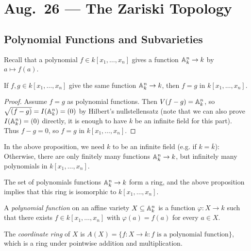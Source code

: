 \chapter{Aug.~26 --- The Zariski Topology}

\section{Polynomial Functions and Subvarieties}

\begin{remark}
  Recall that a polynomial
  $f \in k[x_1, \dots, x_n]$
  gives a function
  $\mathbb{A}_k^n \to k$ by
  $a \mapsto f(a)$.
\end{remark}

\begin{prop}
  If $f, g \in k[x_1, \dots, x_n]$
  give the same function
  $\mathbb{A}_k^n \to k$, then
  $f = g$ in $k[x_1, \dots, x_n]$.
\end{prop}

\begin{proof}
  Assume $f = g$ as polynomial functions.
  Then $V(f - g) = \mathbb{A}_k^n$, so
  $\sqrt{(f - g)} = I(\mathbb{A}_k^n) = (0)$
  by Hilbert's nullstellensatz (note that
  we can also prove $I(\mathbb{A}_k^n) = (0)$
  directly, it is enough to have $k$ be an infinite field for this part). Thus
  $f - g = 0$, so $f = g$ in $k[x_1, \dots, x_n]$.
\end{proof}

\begin{remark}
  In the above proposition, we need
  $k$ to be an infinite field (e.g.
  if $k = \overline{k}$): Otherwise,
  there are only finitely many functions
  $\mathbb{A}_k^n \to k$, but infinitely
  many polynomials in $k[x_1, \dots, x_n]$.
\end{remark}

\begin{remark}
  The set of polynomials functions
  $\mathbb{A}_k^n \to k$ form a ring, and
  the above proposition implies that this
  ring is isomorphic to $k[x_1, \dots, x_n]$.
\end{remark}

\begin{definition}
  A \emph{polynomial function} on an
  affine variety $X \subseteq \mathbb{A}_k^n$
  is a function $\varphi : X \to k$ such
  that there exists $f \in k[x_1, \dots, x_n]$
  with $\varphi(a) = f(a)$ for
  every $a \in X$.
\end{definition}

\begin{definition}
  The \emph{coordinate ring} of $X$ is
  $A(X) = \{f : X \to k : f \text{ is a polynomial function}\}$,
  which is a ring under pointwise addition
  and multiplication.
\end{definition}

